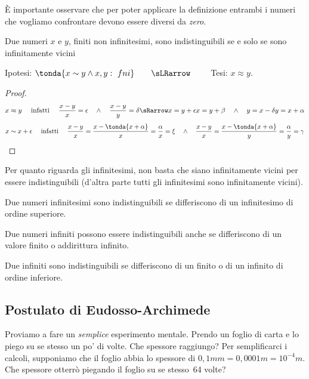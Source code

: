 \begin{osservazione}
 È importante osservare che per poter applicare la definizione entrambi i 
numeri che vogliamo confrontare devono essere diversi da \emph{zero}.
\end{osservazione}

\begin{teorema}
Due numeri $x$ e $y$, finiti non infinitesimi, sono indistinguibili se e solo se 
sono infinitamente vicini
\end{teorema}
\begin{center}
Ipotesi: $\tonda{x \sim y \wedge x,y:\ fni}\qquad \sLRarrow\qquad$ Tesi: $x\approx y$.
\end{center}

\begin{proof}
\[x \approx y \quad \text{ infatti } \quad
\frac{x-y}{x} = \epsilon \quad \wedge \quad 
\frac{x-y}{y} = \delta \sRarrow x=y+\epsilon x=y+\beta \quad \wedge \quad 
y=x-\delta y=x+\alpha
\]
\[x \sim x+\epsilon \quad \text{ infatti } \quad
\frac{x-y}{x}=\frac{x-\tonda{x+\alpha}}{x} = \frac{\alpha}{x}= \xi \quad \wedge \quad 
\frac{x-y}{x}=\frac{x-\tonda{x+\alpha}}{y} = \frac{\alpha}{y}= \gamma
\]
\end{proof}

Per quanto riguarda gli infinitesimi, non basta che siano infinitamente vicini 
per essere indistinguibili (d'altra parte tutti gli infinitesimi sono 
infinitamente vicini).

\begin{teorema}
Due numeri infinitesimi sono indistinguibili se differiscono di un 
infinitesimo di ordine superiore.
\end{teorema}

Due numeri infiniti possono essere indistinguibili anche se differiscono di un 
valore finito o addirittura infinito. 

\begin{teorema}
Due infiniti sono indistinguibili se 
differiscono di un finito o di un infinito di ordine inferiore.
\end{teorema}


\subsection{Postulato di Eudosso-Archimede}
\label{subsec:insnum_eudossoarchimede}

Proviamo a fare un \emph{semplice} esperimento mentale. Prendo un foglio di 
carta e lo piego su se stesso un po' di volte. Che spessore raggiungo?
Per semplificarci i calcoli, supponiamo che il foglio abbia lo spessore 
di $0,1mm = 0,0001m = 10^{-4}m$. 
Che spessore otterrò piegando il foglio su se stesso~64 volte?

